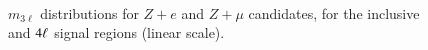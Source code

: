 \begin{figure}[h]
{  }
   \\
  \caption{$m_{3\ell}$ distributions for $Z+e$ and $Z+\mu$ candidates, for the inclusive and $4\ell$ signal regions (linear scale).}
  \label{fig:SR-m3l-1-linear}
\end{figure}

